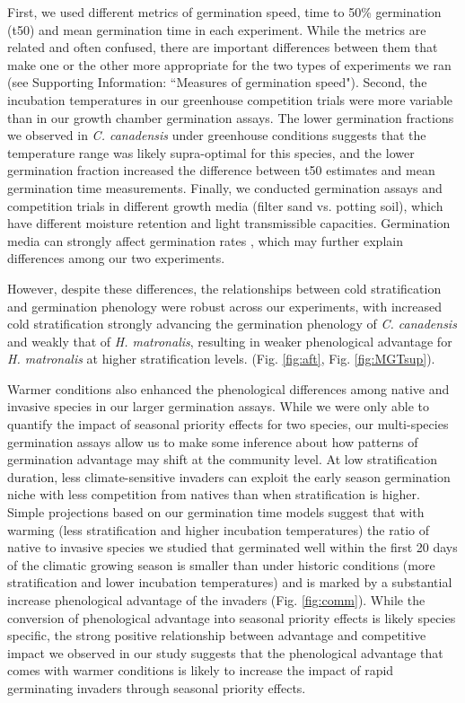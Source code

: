 \documentclass{article}[11pt]
\begin{document}
First, we used different metrics of germination speed, time to 50\% germination (t50) and mean germination time in each experiment. While the metrics are related and often confused, there are important differences between them that make one or the other more appropriate for the two types of experiments we ran (see Supporting Information: ``Measures of germination speed"). Second, the incubation temperatures in our greenhouse competition trials were more variable than in our growth chamber germination assays. The lower germination fractions we observed in \textit{C. canadensis} under greenhouse conditions suggests that the temperature range was likely supra-optimal for this species, and the lower germination fraction increased the difference between t50 estimates and mean germination time measurements. Finally, we  conducted germination assays and competition trials in different growth media (filter sand vs. potting soil), which have different moisture retention and light transmissible capacities. Germination media can strongly affect germination rates \citep{Baskin2014}, which may further explain differences among our two experiments.

However, despite these differences, the relationships between cold stratification and germination phenology were robust across our experiments, with increased cold stratification strongly advancing the germination phenology of \textit{C. canadensis} and weakly that of \textit{H. matronalis}, resulting in weaker phenological advantage for \textit{H. matronalis} at higher stratification levels. (Fig. \ref{fig:aft}, Fig.  \ref{fig:MGTsup}).

Warmer conditions also enhanced the phenological differences among native and invasive species in our larger germination assays. While we were only able to quantify the impact of seasonal priority effects for two species, our multi-species germination assays allow us to make some inference about how patterns of germination advantage may shift at the community level. At low stratification duration, less climate-sensitive invaders can exploit the early season germination niche with less competition from natives than when stratification is higher. Simple projections based on our germination time models suggest that with warming (less stratification and higher incubation temperatures) the ratio of native to invasive species we studied that germinated well within the first 20 days of the climatic growing season is smaller than under historic conditions (more stratification and lower incubation temperatures)  and is marked by a substantial increase phenological advantage of the invaders (Fig. \ref{fig:comm}). While the conversion of phenological advantage into seasonal priority effects is likely species specific, the strong positive relationship between advantage and competitive impact we observed in our study suggests that the phenological advantage that comes with warmer conditions is likely to increase the impact of rapid germinating invaders through seasonal priority effects. 
\end{document}
